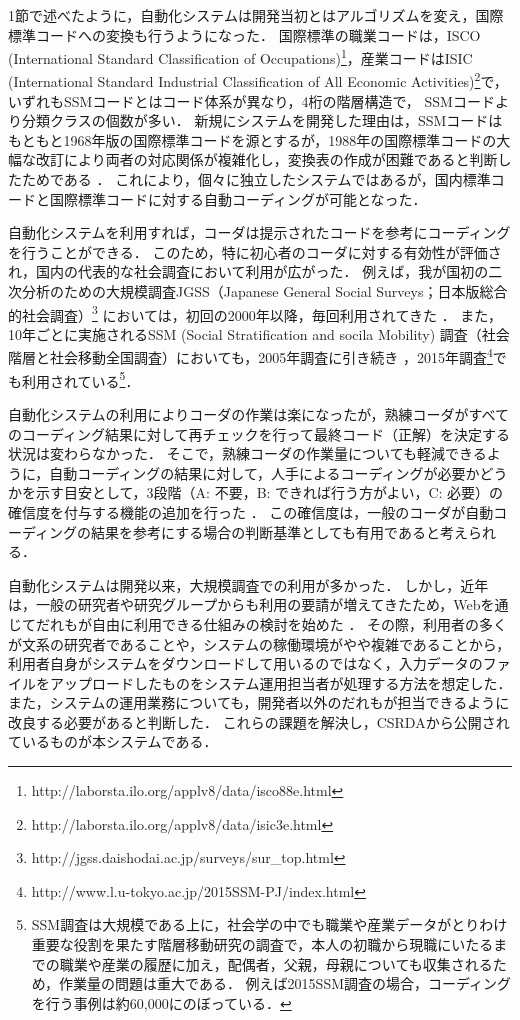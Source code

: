 \documentclass[japanese]{jnlp_1.4}
\begin{document}
1節で述べたように，自動化システムは開発当初とはアルゴリズムを変え，国際標準コードへの変換も行うようになった．
国際標準の職業コードは，ISCO (International Standard Classification of Occupations)\footnote{http://laborsta.ilo.org/applv8/data/isco88e.html}，産業コードはISIC (International Standard Industrial Classification of All Economic Activities)\footnote{http://laborsta.ilo.org/applv8/data/isic3e.html}で，いずれもSSMコードとはコード体系が異なり，4桁の階層構造で，
SSMコードより分類クラスの個数が多い．
新規にシステムを開発した理由は，SSMコードはもともと1968年版の国際標準コードを源とするが，1988年の国際標準コードの大幅な改訂により両者の対応関係が複雑化し，変換表の作成が困難であると判断したためである \cite{Tanabe06}． 
これにより，個々に独立したシステムではあるが，国内標準コードと国際標準コードに対する自動コーディングが可能となった．
 
自動化システムを利用すれば，コーダは提示されたコードを参考にコーディングを行うことができる．
このため，特に初心者のコーダに対する有効性が評価され，国内の代表的な社会調査において利用が広がった．
例えば，我が国初の二次分析のための大規模調査JGSS（Japanese General Social Surveys；日本版総合的社会調査）\footnote{http://jgss.daishodai.ac.jp/surveys/sur\_top.html}
においては，初回の2000年以降，毎回利用されてきた \cite{Takahashi02b,Takahashi03,Takahashi_et_al05b,Takahashi11}．
また，10年ごとに実施されるSSM (Social Stratification and socila Mobility) 調査（社会階層と社会移動全国調査）においても，2005年調査に引き続き \cite{Takahashi08}，2015年調査\footnote{http://www.l.u-tokyo.ac.jp/2015SSM-PJ/index.html}でも利用されている\footnote{SSM調査は大規模である上に，社会学の中でも職業や産業データがとりわけ重要な役割を果たす階層移動研究の調査で，本人の初職から現職にいたるまでの職業や産業の履歴に加え，配偶者，父親，母親についても収集されるため，作業量の問題は重大である．
例えば2015SSM調査の場合，コーディングを行う事例は約60,000にのぼっている．}．

自動化システムの利用によりコーダの作業は楽になったが，熟練コーダがすべてのコーディング結果に対して再チェックを行って最終コード（正解）を決定する状況は変わらなかった．
そこで，熟練コーダの作業量についても軽減できるように，自動コーディングの結果に対して，人手によるコーディングが必要かどうかを示す目安として，3段階（A: 不要，B: できれば行う方がよい，C: 必要）の確信度を付与する機能の追加を行った \cite{Takahashi_et_al13a}．
この確信度は，一般のコーダが自動コーディングの結果を参考にする場合の判断基準としても有用であると考えられる．

自動化システムは開発以来，大規模調査での利用が多かった．
しかし，近年は，一般の研究者や研究グループからも利用の要請が増えてきたため，Webを通じてだれもが自由に利用できる仕組みの検討を始めた \cite{Takahashi_et_al13b}．
その際，利用者の多くが文系の研究者であることや，システムの稼働環境がやや複雑であることから，利用者自身がシステムをダウンロードして用いるのではなく，入力データのファイルをアップロードしたものをシステム運用担当者が処理する方法を想定した．
また，システムの運用業務についても，開発者以外のだれもが担当できるように改良する必要があると判断した．
これらの課題を解決し，CSRDAから公開されているものが本システムである．
\end{document}
